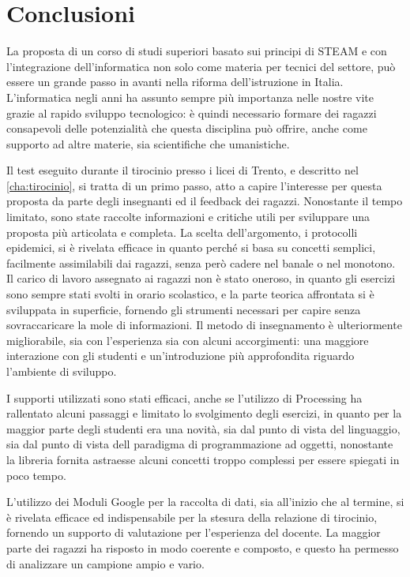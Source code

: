 \chapter*{Conclusioni} %
\label{conclusioni}


La proposta di un corso di studi superiori basato sui principi di STEAM e con l'integrazione dell'informatica non solo come materia per tecnici del settore, può essere un grande passo in avanti nella riforma dell'istruzione in Italia. L'informatica negli anni ha assunto sempre più importanza nelle nostre vite grazie al rapido sviluppo tecnologico: è quindi necessario formare dei ragazzi consapevoli delle potenzialità che questa disciplina può offrire, anche come supporto ad altre materie, sia scientifiche che umanistiche.

Il test eseguito durante il tirocinio presso i licei di Trento, e descritto nel \autoref{cha:tirocinio}, si tratta di un primo passo, atto a capire l'interesse per questa proposta da parte degli insegnanti ed il feedback dei ragazzi. Nonostante il tempo limitato, sono state raccolte informazioni e critiche utili per sviluppare una proposta più articolata e completa. La scelta dell'argomento, i protocolli epidemici, si è rivelata efficace in quanto perché si basa su concetti semplici, facilmente assimilabili dai ragazzi, senza però cadere nel banale o nel monotono. Il carico di lavoro assegnato ai ragazzi non è stato oneroso, in quanto gli esercizi sono sempre stati svolti in orario scolastico, e la parte teorica affrontata si è sviluppata in superficie, fornendo gli strumenti necessari per capire senza sovraccaricare la mole di informazioni. Il metodo di insegnamento è ulteriormente migliorabile, sia con l'esperienza sia con alcuni accorgimenti: una maggiore interazione con gli studenti e un'introduzione più approfondita riguardo l'ambiente di sviluppo.

I supporti utilizzati sono stati efficaci, anche se l'utilizzo di Processing ha rallentato alcuni passaggi e limitato lo svolgimento degli esercizi, in quanto per la maggior parte degli studenti era una novità, sia dal punto di vista del linguaggio, sia dal punto di vista dell paradigma di programmazione ad oggetti, nonostante la libreria fornita astraesse alcuni concetti troppo complessi per essere spiegati in poco tempo. 

L'utilizzo dei Moduli Google per la raccolta di dati, sia all'inizio che al termine, si è rivelata efficace ed indispensabile per la stesura della relazione di tirocinio, fornendo un supporto di valutazione per l'esperienza del docente. La maggior parte dei ragazzi ha risposto in modo coerente e composto, e questo ha permesso di analizzare un campione ampio e vario. 

